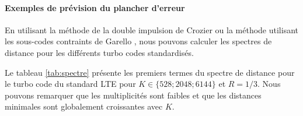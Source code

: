 \paragraph*{Exemples de prévision du plancher d'erreur}
En utilisant la méthode de la double impulsion de Crozier \cite{crozierDIM} ou la méthode utilisant les sous-codes 
contraints de Garello \cite{garellodfree}, nous pouvons calculer les spectres de distance pour les différents turbo codes standardisés.

Le tableau \ref{tab:spectre} présente les premiers termes du spectre de distance pour le turbo code du standard LTE pour 
$K \in \{528; 2048; 6144\}$ et $R=1/3$. Nous pouvons remarquer que les multiplicités sont faibles et que les distances 
minimales sont globalement croissantes avec $K$.

% 			


